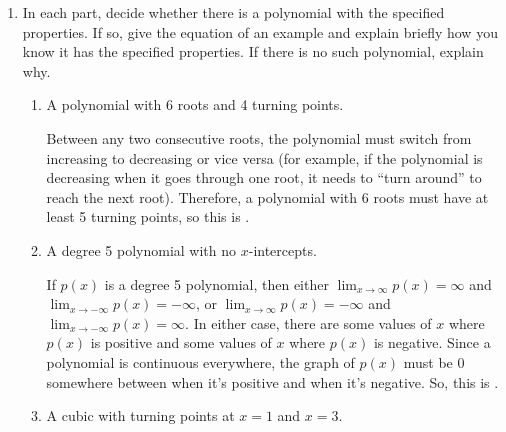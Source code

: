 \documentclass{article}
\theoremstyle{theorem}
\begin{document}
\begin{enumerate}
\begin{enumerate}
  \end{enumerate}

\item {} 

  In each part, decide whether there is a polynomial with the specified properties. If so, give the equation of an example and explain briefly how you know it has the specified properties. If there is no such polynomial, explain why.

  \begin{enumerate}

  \item
    \begin{problem}[\vfill]
      A polynomial with 6 roots and 4 turning points. 
    \end{problem}

    \begin{solution}
      Between any two consecutive roots, the polynomial must switch from increasing to decreasing or vice versa (for example, if the polynomial is decreasing when it goes through one root, it needs to ``turn around'' to reach the next root). Therefore, a polynomial with 6 roots must have at least 5 turning points, so this is . 
    \end{solution}

  \item
    \begin{problem}[\vfill\newpage]
      A degree 5 polynomial with no $x$-intercepts.
    \end{problem}

    \begin{solution}
      If $p(x)$ is a degree 5 polynomial, then either $\displaystyle\lim_{x \to \infty} p(x)=\infty$ and $\displaystyle\lim_{x \to -\infty} p(x) = -\infty$, or $\displaystyle\lim_{x \to \infty} p(x)=-\infty$ and $\displaystyle\lim_{x \to -\infty} p(x)=\infty$. In either case, there are some values of $x$ where $p(x)$ is positive and some values of $x$ where $p(x)$ is negative. Since a polynomial is continuous everywhere, the graph of $p(x)$ must be 0 somewhere between when it's positive and when it's negative. So, this is .
    \end{solution}

  \item
    \begin{problem}[\nstretch{1.25}]
      A cubic with turning points at $x=1$ and $x=3$.
    \end{problem}


\end{enumerate}
\end{enumerate}
\end{document}

